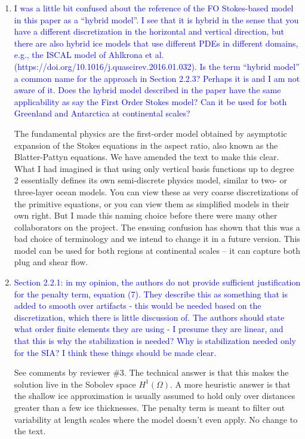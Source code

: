\documentclass{article}
\theoremstyle{definition}
\theoremstyle{plain}
\begin{document}
\begin{enumerate}
\item \textcolor{blue}{I was a little bit confused about the reference of the FO Stokes-based model in this paper as a ``hybrid
model''. I see that it is hybrid in the sense that you have a different discretization in the horizontal and
vertical direction, but there are also hybrid ice models that use different PDEs in different domains,
e.g., the ISCAL model of Ahlkrona et al. (https://doi.org/10.1016/j.quascirev.2016.01.032).
Is the term ``hybrid model'' a common name for the approach in Section 2.2.3? Perhaps it is and I
am not aware of it.
Does the hybrid model described in the paper have the same applicability as say the First Order
Stokes model? Can it be used for both Greenland and Antarctica at continental scales?}

The fundamental physics are the first-order model obtained by asymptotic expansion of the Stokes equations in the aspect ratio, also known as the Blatter-Pattyn equations.
We have amended the text to make this clear.
What I had imagined is that using only vertical basis functions up to degree 2 essentially defines its own semi-discrete physics model, similar to two- or three-layer ocean models.
You can view these as very coarse discretizations of the primitive equations, or you can view them as simplified models in their own right.
But I made this naming choice before there were many other collaborators on the project.
The ensuing confusion has shown that this was a bad choice of terminology and we intend to change it in a future version.
This model can be used for both regions at continental scales -- it can capture both plug and shear flow.

\item \textcolor{blue}{Section 2.2.1: in my opinion, the authors do not provide sufficient justification for the penalty term,
equation (7). They describe this as something that is added to smooth over artifacts - this would be
needed based on the discretization, which there is little discussion of. The authors should state what
order finite elements they are using - I presume they are linear, and that this is why the stabilization
is needed? Why is stabilization needed only for the SIA? I think these things should be made clear.}

See comments by reviewer \#3.
The technical answer is that this makes the solution live in the Sobolev space $H^1(\Omega)$.
A more heuristic answer is that the shallow ice approximation is usually assumed to hold only over distances greater than a few ice thicknesses.
The penalty term is meant to filter out variability at length scales where the model doesn't even apply.
No change to the text.


\end{enumerate}
\end{document}

